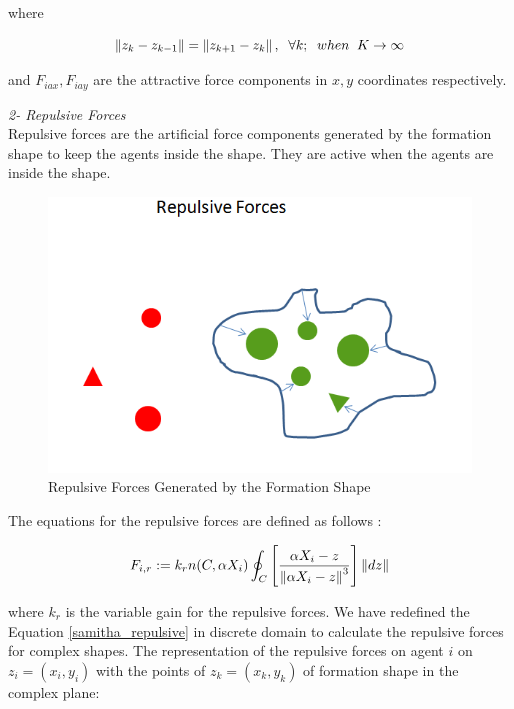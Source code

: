where

\begin{equation}
\left\lVert z_k - z_{k-1}\right\rVert = \left\lVert z_{k+1} - z_k\right\rVert, \hspace{0.2cm}  \forall k ;  \hspace{0.2cm} when  \hspace{0.2cm} K \to\infty
\end{equation}
			
and $F_{iax} , F_{iay} $ are the attractive force components in $x,y$ coordinates respectively.\newline
			
\textit{	2- Repulsive Forces} \\ 
Repulsive forces are the artificial force components generated by the formation shape to keep the agents inside the shape. They are active when the agents are inside the shape. 
					
\begin{figure}[H]
\caption{Repulsive Forces Generated by the Formation Shape}
\centering
\includegraphics[scale = 0.60]{repulsive_forces}
\end{figure}
							
The equations for the repulsive forces are defined as follows \cite{17}:	

\begin{equation} \label{samitha_repulsive}
F_{i,r} := k_r  n(C,\alpha X_i) \oint_C \left[\frac{\alpha X_i - z}{\left\lVert\alpha X_i - z\right\rVert^3}\right] \left\lVert dz\right\rVert
\end{equation}

where $k_r$ is the variable gain for the repulsive forces. We have redefined the Equation \ref{samitha_repulsive} in discrete domain to calculate the repulsive forces for complex shapes. The representation of the repulsive forces on agent $i$ on $z_i = (x_i, y_i)$ with the points of  $z_k = (x_k,y_k)$ of formation shape in the complex plane:

